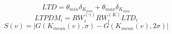 \begin{equation}
LTD =\theta_{min} \delta_{K_{min}} +\theta_{max} \delta_{K_{max}}
\end{equation}
\begin{equation}
LTPDM_i =RW^{(\gamma)}_iRW^{(K)}_iLTD_i
\end{equation}
\begin{equation}
S(v)= |G(K_{mean}(v), \sigma) - G(K_{mean}(v), 2\sigma)|
\end{equation}